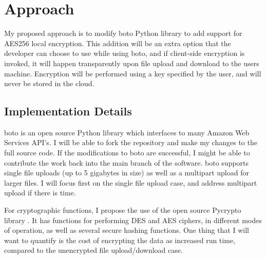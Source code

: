 \section{Approach}

My proposed approach is to modify boto Python library to add support for AES256 local encryption. 
This addition will be an extra option that the developer can choose to use while using boto, and if client-side encryption
is invoked, it will happen transparently upon file upload and download to the users machine. Encryption will be performed
using a key specified by the user, and will never be stored in the cloud.

\subsection{Implementation Details}

boto is an open source Python library which interfaces to many Amazon Web Services API's. I will be able to fork the repository and make my changes to the full source code.
If the modifications to boto are successful, I might be able to contribute the work back into the main branch of the software.
boto supports single file uploads (up to 5 gigabytes in size) as well as a multipart upload for larger files. I will focus first on the single file upload case, and address multipart upload if there is time.

For cryptographic functions, I propose the use of the open source Pycrypto library \cite{pycrypto}. It has functions for performing DES and AES ciphers, in different modes of operation, as well as several secure hashing functions.
One thing that I will want to quantify is the cost of encrypting the data as increased run time, compared to the unencrypted file upload/download case.

